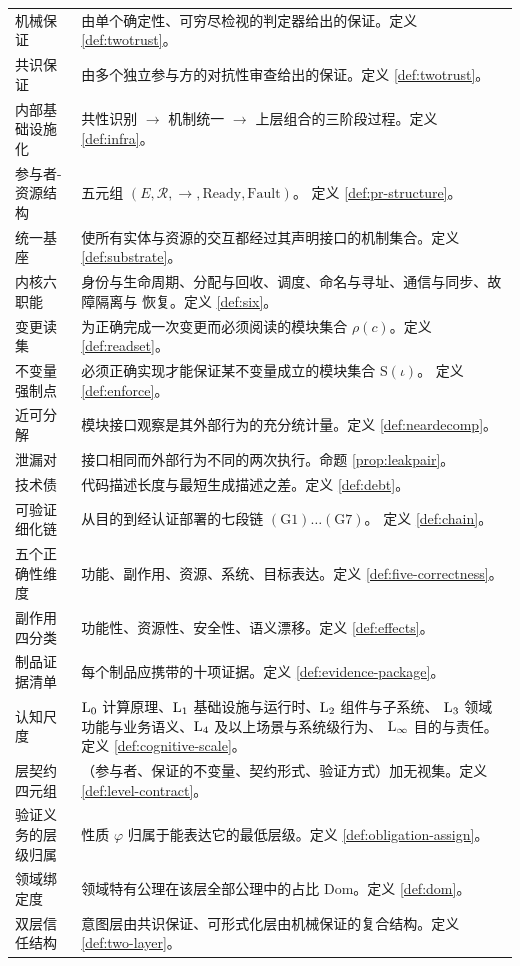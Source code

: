 \begin{longtable}{L{3.4cm}L{11.0cm}}
机械保证 & 由单个确定性、可穷尽检视的判定器给出的保证。定义 \ref{def:twotrust}。 \\
共识保证 & 由多个独立参与方的对抗性审查给出的保证。定义 \ref{def:twotrust}。 \\
内部基础设施化 & 共性识别 $\to$ 机制统一 $\to$ 上层组合的三阶段过程。定义
  \ref{def:infra}。 \\
参与者-资源结构 & 五元组 $(E, \mathcal{R}, \to, \mathrm{Ready}, \mathrm{Fault})$。
  定义 \ref{def:pr-structure}。 \\
统一基座 & 使所有实体与资源的交互都经过其声明接口的机制集合。定义
  \ref{def:substrate}。 \\
内核六职能 & 身份与生命周期、分配与回收、调度、命名与寻址、通信与同步、故障隔离与
  恢复。定义 \ref{def:six}。 \\
变更读集 & 为正确完成一次变更而必须阅读的模块集合 $\rho(c)$。定义
  \ref{def:readset}。 \\
不变量强制点 & 必须正确实现才能保证某不变量成立的模块集合 $\mathrm{S}(\iota)$。
  定义 \ref{def:enforce}。 \\
近可分解 & 模块接口观察是其外部行为的充分统计量。定义 \ref{def:neardecomp}。 \\
泄漏对 & 接口相同而外部行为不同的两次执行。命题 \ref{prop:leakpair}。 \\
技术债 & 代码描述长度与最短生成描述之差。定义 \ref{def:debt}。 \\
可验证细化链 & 从目的到经认证部署的七段链 $(\mathrm{G}1)\dots(\mathrm{G}7)$。
  定义 \ref{def:chain}。 \\
五个正确性维度 & 功能、副作用、资源、系统、目标表达。定义
  \ref{def:five-correctness}。 \\
副作用四分类 & 功能性、资源性、安全性、语义漂移。定义 \ref{def:effects}。 \\
制品证据清单 & 每个制品应携带的十项证据。定义 \ref{def:evidence-package}。 \\
认知尺度 & $\mathrm{L}_{0}$ 计算原理、$\mathrm{L}_{1}$ 基础设施与运行时、$\mathrm{L}_{2}$ 组件与子系统、
  $\mathrm{L}_{3}$ 领域功能与业务语义、$\mathrm{L}_{4}$ 及以上场景与系统级行为、
  $\mathrm{L}_{\infty}$ 目的与责任。定义 \ref{def:cognitive-scale}。 \\
层契约四元组 & （参与者、保证的不变量、契约形式、验证方式）加无视集。定义
  \ref{def:level-contract}。 \\
验证义务的层级归属 & 性质 $\varphi$ 归属于能表达它的最低层级。定义
  \ref{def:obligation-assign}。 \\
领域绑定度 & 领域特有公理在该层全部公理中的占比 $\mathrm{Dom}$。定义
  \ref{def:dom}。 \\
双层信任结构 & 意图层由共识保证、可形式化层由机械保证的复合结构。定义
  \ref{def:two-layer}。 \\
\bottomrule
\end{longtable}

